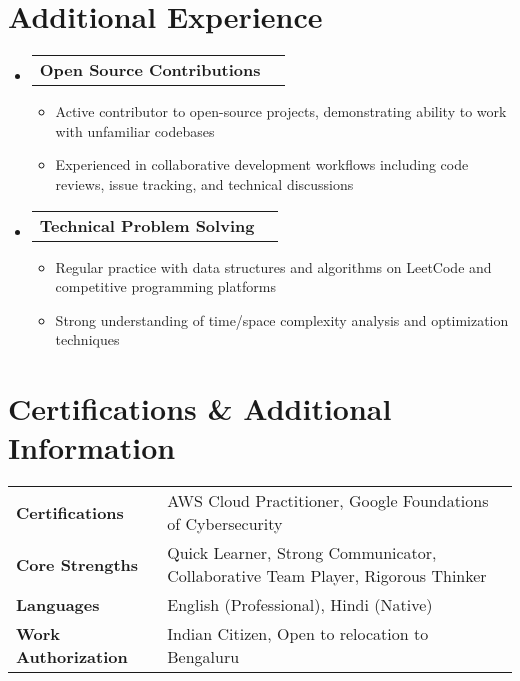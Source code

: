 \documentclass[letterpaper,10pt]{article}
\makeatletter
\newcommand{\resumeItem}[1]{
  \item\small{#1 \vspace{-2pt}}
}
\newcommand{\resumeProjectHeading}[2]{
    \item[]
    \begin{tabular*}{\textwidth}{l@{\extracolsep{\fill}}r}
      \small#1 & {\small #2}
    \end{tabular*}\vspace{-7pt}
}
\newcommand{\resumeSubHeadingListStart}{\begin{itemize}[leftmargin=0in, label={}]}
\newcommand{\resumeSubHeadingListEnd}{\end{itemize}\vspace{-5pt}}
\newcommand{\resumeItemListStart}{\begin{itemize}[leftmargin=0.2in, rightmargin=0in]}
\newcommand{\resumeItemListEnd}{\end{itemize}\vspace{-2pt}}
\makeatother
\begin{document}
\section{Additional Experience}
\resumeSubHeadingListStart

\resumeProjectHeading
  {\textbf{Open Source Contributions}}{}
  \resumeItemListStart
    \resumeItem{Active contributor to open-source projects, demonstrating ability to work with unfamiliar codebases}
    \resumeItem{Experienced in collaborative development workflows including code reviews, issue tracking, and technical discussions}
  \resumeItemListEnd

\resumeProjectHeading
  {\textbf{Technical Problem Solving}}{}
  \resumeItemListStart
    \resumeItem{Regular practice with data structures and algorithms on LeetCode and competitive programming platforms}
    \resumeItem{Strong understanding of time/space complexity analysis and optimization techniques}
  \resumeItemListEnd

\resumeSubHeadingListEnd

\section{Certifications \& Additional Information}
\vspace{2pt}
\begin{tabularx}{\textwidth}{@{}l X@{}}
\textbf{Certifications} & AWS Cloud Practitioner, Google Foundations of Cybersecurity \\
\textbf{Core Strengths} & Quick Learner, Strong Communicator, Collaborative Team Player, Rigorous Thinker \\
\textbf{Languages} & English (Professional), Hindi (Native) \\
\textbf{Work Authorization} & Indian Citizen, Open to relocation to Bengaluru \\
\end{tabularx}
\end{document}
